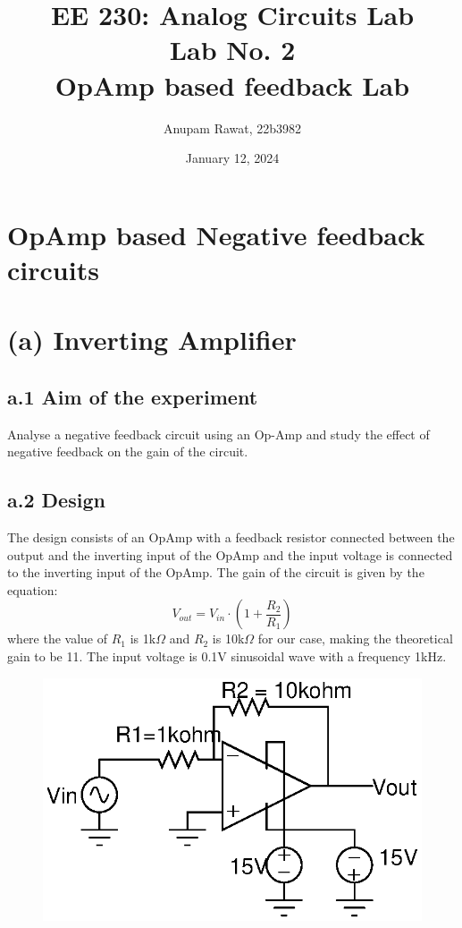 \documentclass[12pt]{article}
\title{EE 230: Analog Circuits Lab\\ Lab No. 2\\ OpAmp based feedback Lab}
\author{Anupam Rawat, 22b3982}
\date{January 12, 2024}
\begin{document}
\maketitle

\section{OpAmp based Negative feedback circuits}

\section*{(a) Inverting Amplifier}
\subsection*{a.1 Aim of the experiment}
Analyse a negative feedback circuit using an Op-Amp and study the effect of negative feedback on the gain of the circuit.

\subsection*{a.2 Design}
The design consists of an OpAmp with a feedback resistor connected between the output and the inverting input of the OpAmp and the input voltage is connected to the inverting input of the OpAmp. The gain of the circuit is given by the equation:
 \begin{equation}
     V_{out} = V_{in} \cdot (1 + \frac{R_{2}}{R_{1}})
 \end{equation}     
 where the value of $R_{1}$ is 1k$\Omega$ and $R_{2}$ is 10k$\Omega$ for our case, making the theoretical gain to be 11. The input voltage is 0.1V sinusoidal wave with a frequency 1kHz.
\begin{figure}[h!]
\centering
\includegraphics[scale = 1]{Exp_1_a.eps}
\end{figure}
\newpage
\end{document}
